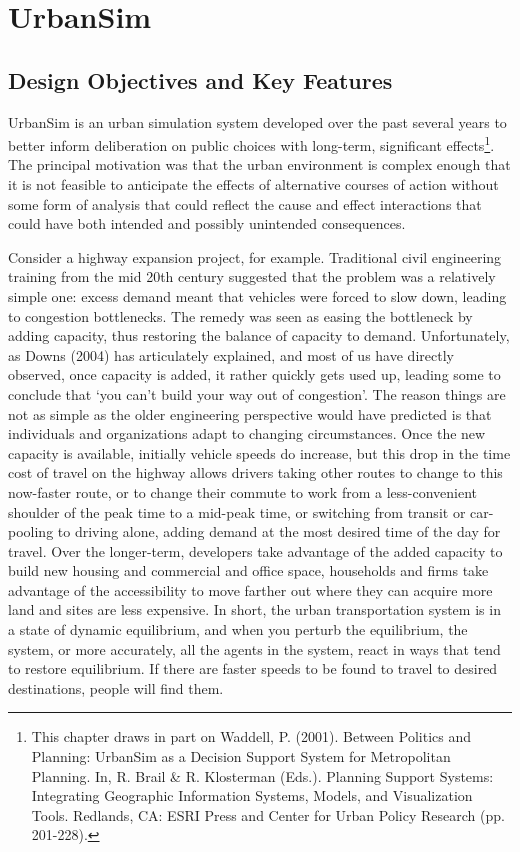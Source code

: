 \chapter{UrbanSim}

\section{Design Objectives and Key Features}

UrbanSim is an urban simulation system developed over the past
several years to better inform deliberation on public choices with
long-term, significant effects\footnote{This chapter draws in part
on Waddell, P.  (2001). Between Politics and Planning: UrbanSim as a
Decision Support System for Metropolitan Planning. In, R. Brail \&
R. Klosterman (Eds.). Planning Support Systems: Integrating
Geographic Information Systems, Models, and Visualization Tools.
Redlands, CA: ESRI Press and Center for Urban Policy Research (pp.
201-228).}.  The principal motivation was that the urban environment
is complex enough that it is not feasible to anticipate the effects
of alternative courses of action without some form of analysis that
could reflect the cause and effect interactions that could have both
intended and possibly unintended consequences.

Consider a highway expansion project, for example.  Traditional civil engineering training from the mid 20th century suggested that the problem was a relatively simple one: excess demand meant that vehicles were forced to slow down, leading to congestion bottlenecks.  The remedy was seen as easing the bottleneck by adding capacity, thus restoring the balance of capacity to demand.  Unfortunately, as Downs (2004) has articulately explained, and most of us have directly observed, once capacity is added, it rather quickly gets used up, leading some to conclude that `you can't build your way out of congestion'. The reason things are not as simple as the older engineering perspective would have predicted is that individuals and organizations adapt to changing circumstances.  Once the new capacity is available, initially vehicle speeds do increase, but this drop in the time cost of travel on the highway allows drivers taking other routes to change to this now-faster route, or to change their commute to work from a less-convenient shoulder of the peak time to a mid-peak time, or switching from transit or car-pooling to driving alone, adding demand at the most desired time of the day for travel.  Over the longer-term, developers take advantage of the added capacity to build new housing and commercial and office space, households and firms take advantage of the accessibility to move farther out where they can acquire more land and sites are less expensive.  In short, the urban transportation system is in a state of dynamic equilibrium, and when you perturb the equilibrium, the system, or more accurately, all the agents in the system, react in ways that tend to restore equilibrium.  If there are faster speeds to be found to travel to desired destinations, people will find them.


